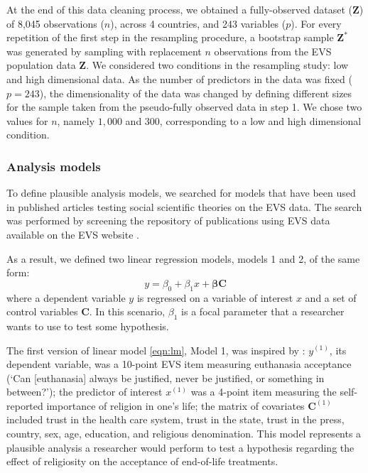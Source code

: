 	At the end of this data cleaning process, we obtained a fully-observed dataset ($\bm{Z}$) of 8,045 observations 
	($n$), across 4 countries, and 243 variables ($p$).
	For every repetition of the first step in the resampling procedure, a bootstrap sample $\bm{Z}^{*}$ was 
	generated by sampling with replacement $n$ observations from the EVS population data $\bm{Z}$.
	We considered two conditions in the resampling study: low and high dimensional data.
	As the number of predictors in the data was fixed ($p = 243$), the dimensionality of the data was 
	changed by defining different sizes for the sample taken from the pseudo-fully observed data in
	step 1.
	We chose two values for $n$, namely $1,000$ and $300$, corresponding to a low and high 
	dimensional condition.

\subsubsection{Analysis models}

	To define plausible analysis models, we searched for models that have been used in published articles
	testing social scientific theories on the EVS data.
	The search was performed by screening the repository of publications using EVS data available on the EVS 
	website \citep{EVSbib}.

	As a result, we defined two linear regression models, models 1 and 2, of the same form:
%	
	\begin{equation}
		y = \beta_{0} + \beta_{1} x + \bm{\beta} \bm{C}  \label{eqn:lm}
	\end{equation}
%
	where a dependent variable $y$ is regressed on a variable of interest $x$ and a set of control variables
	$\bm{C}$.
	In this scenario, $\beta_{1}$ is a focal parameter that a researcher wants to use to test some hypothesis.

	The first version of linear model \eqref{eqn:lm}, Model 1, was inspired by \cite{koneke:2014}:
	$y^{(1)}$, its dependent variable, was a 10-point EVS item measuring euthanasia acceptance 
	(`Can [euthanasia] always be justified, never be justified, or something in between?');
	the predictor of interest $x^{(1)}$ was a 4-point item measuring the self-reported importance of religion in 
	one's life;
	the matrix of covariates $\bm{C}^{(1)}$ included trust in the health care system, trust in the state, 
	trust in the press, country, sex, age, education, and religious denomination.
	This model represents a plausible analysis a researcher would perform to test a hypothesis regarding the 
	effect of religiosity on the acceptance of end-of-life treatments.

